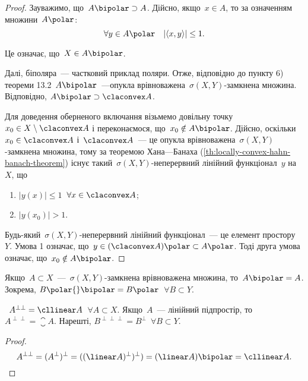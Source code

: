 \begin{proof}
    Зауважимо, що~$A\bipolar \supset A$. Дійсно, якщо~$x \in A$, то за означенням множини~$A\polar$:
    \begin{equation*}
        \forall y \in A\polar \quad |\langle x, y \rangle| \le 1.
    \end{equation*}

    Це означає, що~$X \in A\bipolar$.

    Далі, біполяра~--- частковий приклад поляри. Отже, відповідно до пункту 6) теореми 13.2~$A\bipolar$~---опукла врівноважена~$\sigma(X, Y)$-замкнена множина. Відповідно, $A\bipolar \supset \claconvex A$.
    
    Для доведення оберненого включання візьмемо довільну точку~$x_0 \in X \setminus \claconvex A$ і переконаємося, що~$x_0 \notin A\bipolar$. Дійсно, оскільки~$x_0 \in \claconvex A$ і~$\claconvex A$~--- це опукла врівноважена~$\sigma(X, Y)$-замкнена множина, тому за теоремою Хана---Банаха (\cref{th:locally-convex-hahn-banach-theorem}) існує такий~$\sigma(X, Y)$-неперервний лінійний функціонал~$y$ на~$X$, що
    \begin{enumerate}
        \item $|y(x)| \le 1$~$\forall x \in \claconvex A$;
        \item $|y(x_0)| > 1$.
    \end{enumerate}

    Будь-який~$\sigma(X, Y)$-неперервний лінійний функціонал~--- це елемент простору~$Y$. Умова 1 означає, що~$y \in (\claconvex A)\polar \subset A\polar$. Тоді друга умова означає, що~$x_0 \notin A\bipolar$.
\end{proof}

\begin{corollary}
    Якщо~$A \subset X$~---~$\sigma(X, Y)$-замкнена врівноважена множина, то~$A\bipolar = A$. Зокрема, $B\polar{}\bipolar = B\polar$~$\forall B \subset Y$.
\end{corollary}

\begin{corollary}
   ~$A^{\perp\perp} = \cllinear A$~$\forall A \subset X$. Якщо~$A$~--- лінійний підпростір, то~$A^{\perp\perp} = \closure A$. Нарешті, $B^{\perp\perp\perp} = B^\perp$~$\forall B \subset Y$.
\end{corollary}

\begin{proof}
    \begin{equation*}
        A^{\perp\perp} = (A^\perp)^\perp = ((\linear A)^\perp)^\perp) = (\linear A)\bipolar = \cllinear A. \qedhere
    \end{equation*}
\end{proof}

